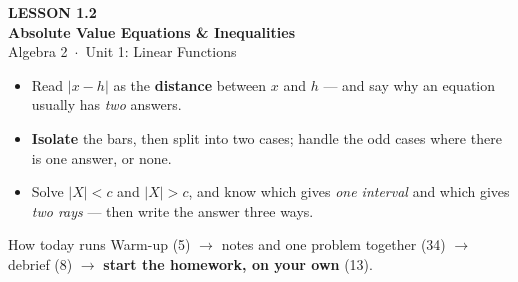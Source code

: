 \documentclass[aspectratio=169, 11pt]{beamer}
\begin{document}
{
\begin{frame}[plain]
  \vspace{2.8cm}\hspace{0.55cm}%
  \begin{minipage}{0.9\textwidth}
    {\color{goldacc}\bfseries\small LESSON 1.2}\\[0.5cm]
    {\color{white}\bfseries\LARGE Absolute Value Equations \& Inequalities}\\[1.2cm]
    {\color{forestmid}\small Algebra 2~$\cdot$~Unit 1: Linear Functions}
  \end{minipage}
\end{frame}
}

\begin{frame}[t, plain]
  \begin{itemize}\setlength{\itemsep}{6pt}
    \item Read $|x-h|$ as the \textbf{distance} between $x$ and $h$ --- and say why an equation
          usually has \emph{two} answers.
    \item \textbf{Isolate} the bars, then split into two cases; handle the odd cases where there
          is one answer, or none.
    \item Solve $|X|<c$ and $|X|>c$, and know which gives \emph{one interval} and which gives
          \emph{two rays} --- then write the answer three ways.
  \end{itemize}
  \vspace{4pt}
  \begin{block}{How today runs}
    Warm-up (5) $\to$ notes and one problem together (34) $\to$ debrief (8) $\to$
    \textbf{start the homework, on your own} (13).
  \end{block}
\end{frame}
\end{document}
